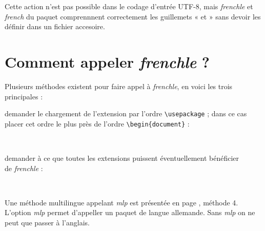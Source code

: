 \documentclass[a4paper,12pt,openright]{article}
\begin{document}
Cette action n'est pas possible dans le codage d'entrée UTF-8, mais \textsl{frenchle} et 
\textsl{french} du paquet \slefr comprennnent correctement les guillemets 
« et » sans devoir les définir dans un fichier accesoire.

\section{Comment appeler \textit{frenchle} ?}
Plusieurs méthodes existent pour faire appel à \textit{frenchle}, en voici les trois
principales :
\begin{description}
\item[1\iere méthode :] demander le chargement de l’extension par l’ordre \verb|\usepackage| ;
dans ce cas placer cet ordre le plus près de l’ordre \verb|\begin{document}| :\\[.5em]
\rule{0pt}{1em}\hfill{}\hfill\rule{0pt}{1em}\\[.5em]
\item[2\ieme méthode :]  demander à ce que toutes les extensions puissent éventuellement
bénéficier\\ de \textit{frenchle} :\\[.5em]
\rule{0pt}{1em}\hfill{}\hfill\rule{0pt}{1em}\\[.5em]

\item \MAJ Une méthode multilingue appelant  \textsl{mlp} est présentée en page \pageref{meth4}, méthode 4.
L'option \textsl{mlp} permet d'appeller un paquet de langue allemande. 
Sans \textsl{mlp} on ne peut que passer à l'anglais.\endMAJ
\end{description}
\end{document}
